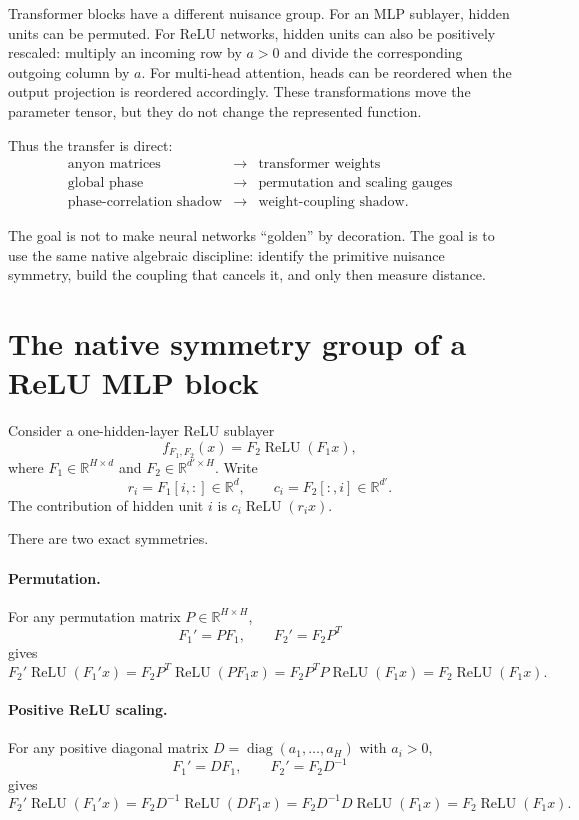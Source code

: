 \documentclass[11pt]{article}
\newcommand{\R}{\mathbb{R}}
\newcommand{\diag}{\operatorname{diag}}
\newcommand{\relu}{\operatorname{ReLU}}
\begin{document}
Transformer blocks have a different nuisance group. For an MLP sublayer, hidden units can be permuted. For ReLU networks, hidden units can also be positively rescaled: multiply an incoming row by $a>0$ and divide the corresponding outgoing column by $a$. For multi-head attention, heads can be reordered when the output projection is reordered accordingly. These transformations move the parameter tensor, but they do not change the represented function.

Thus the transfer is direct:
\[
\begin{array}{ccc}
\text{anyon matrices} & \longrightarrow & \text{transformer weights}\\[2pt]
\text{global phase} & \longrightarrow & \text{permutation and scaling gauges}\\[2pt]
\text{phase-correlation shadow} & \longrightarrow & \text{weight-coupling shadow}.
\end{array}
\]

The goal is not to make neural networks ``golden'' by decoration. The goal is to use the same native algebraic discipline: identify the primitive nuisance symmetry, build the coupling that cancels it, and only then measure distance.

\section{The native symmetry group of a ReLU MLP block}

Consider a one-hidden-layer ReLU sublayer
\begin{equation}
  f_{F_1,F_2}(x)=F_2\relu(F_1x),
  \label{eq:mlp}
\end{equation}
where $F_1\in\R^{H\times d}$ and $F_2\in\R^{d'\times H}$. Write
\[
 r_i=F_1[i,:]\in\R^d,\qquad c_i=F_2[:,i]\in\R^{d'}.
\]
The contribution of hidden unit $i$ is $c_i\relu(r_ix)$.

There are two exact symmetries.

\paragraph{Permutation.} For any permutation matrix $P\in\R^{H\times H}$,
\[
F_1' = PF_1,\qquad F_2'=F_2P^T
\]
gives
\[
F_2'\relu(F_1'x)=F_2P^T\relu(PF_1x)=F_2P^TP\relu(F_1x)=F_2\relu(F_1x).
\]

\paragraph{Positive ReLU scaling.} For any positive diagonal matrix $D=\diag(a_1,\ldots,a_H)$ with $a_i>0$,
\[
F_1'=DF_1,\qquad F_2'=F_2D^{-1}
\]
gives
\[
F_2'\relu(F_1'x)=F_2D^{-1}\relu(DF_1x)=F_2D^{-1}D\relu(F_1x)=F_2\relu(F_1x).
\]
\end{document}
